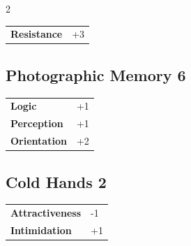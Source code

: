 \begin{multicols}{2}
\begin{tcolorbox}
\begin{tabular}{@{}ll@{}}
    \textbf{Resistance} & +3\\
\end{tabular}


\end{tcolorbox}

\begin{tcolorbox}
    \subsection*{Photographic Memory \hfill \small{6 }}
    \tcblower




\begin{tabular}{@{}ll@{}}
    \textbf{Logic} & +1\\
    \textbf{Perception} & +1\\
    \textbf{Orientation} & +2\\
\end{tabular}


\end{tcolorbox}

\begin{tcolorbox}
    \subsection*{Cold Hands \hfill \small{2 }}
    \tcblower




\begin{tabular}{@{}ll@{}}
    \textbf{Attractiveness} & -1\\
    \textbf{Intimidation} & +1\\
\end{tabular}


\end{tcolorbox}

\begin{tcolorbox}

\end{tcolorbox}
\end{multicols}
